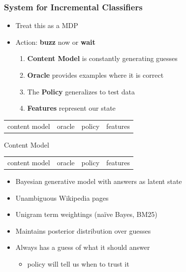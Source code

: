 \documentclass[compress]{beamer}
\begin{document}
\begin{frame}
	\frametitle{System for Incremental Classifiers}

	\begin{itemize}
		\item Treat this as a MDP
		\item Action: {\bf buzz} now or {\bf wait}
                     \pause
                    \begin{enumerate}
                  \item {\bf Content Model} is constantly generating guesses
                     \item {\bf Oracle} provides examples where it is correct
                   \item The {\bf Policy} generalizes to test data
                       \item {\bf Features} represent our state
                    \end{enumerate}
	\end{itemize}
\begin{block}{}
  \begin{center}
    \vspace{-.5cm}
    \begin{tabular}{cccc}
      \alert<3->{content model} & oracle & policy & features \\
    \end{tabular}
    \vspace{-.5cm}
  \end{center}
\end{block}
\end{frame}


\begin{frame}{Content Model}

\begin{block}{}
  \begin{center}
    \vspace{-.5cm}
    \begin{tabular}{cccc}
      \alert{content model} & oracle & policy & features \\
    \end{tabular}
    \vspace{-.5cm}
  \end{center}
\end{block}


  \begin{itemize}
   \item Bayesian generative model with answers as latent state
         \item Unambiguous Wikipedia pages
           \item Unigram term weightings (na\"ive Bayes, BM25)
    \item Maintains posterior distribution over guesses
    \item Always has a guess of what it should answer
      \begin{itemize}
        \item policy will tell us when to trust it
       \end{itemize}

  \end{itemize}
\end{frame}
\end{document}
